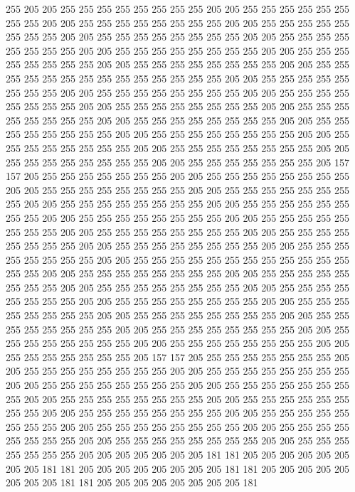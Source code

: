 255 205 205 255 255 255 255 255 255 255 255 205 205 255 255 255 255 255 255 255
255 205 205 255 255 255 255 255 255 255 255 205 205 255 255 255 255 255 255 255
255 205 205 255 255 255 255 255 255 255 255 205 205 255 255 255 255 255 255 255
255 205 205 255 255 255 255 255 255 255 255 205 205 255 255 255 255 255 255 255
255 205 205 255 255 255 255 255 255 255 255 205 205 255 255 255 255 255 255 255
255 255 255 255 255 255 255 205 205 255 255 255 255 255 255 255 255 205 205 255
255 255 255 255 255 255 255 205 205 255 255 255 255 255 255 255 255 205 205 255
255 255 255 255 255 255 255 205 205 255 255 255 255 255 255 255 255 205 205 255
255 255 255 255 255 255 255 205 205 255 255 255 255 255 255 255 255 205 205 255
255 255 255 255 255 255 255 205 205 255 255 255 255 255 255 255 255 205 205 255
255 255 255 255 255 255 255 205 205 255 255 255 255 255 255 255 255 205 205 255
255 255 255 255 255 255 205 157 157 205 255 255 255 255 255 255 255 205 205 255
255 255 255 255 255 255 255 205 205 255 255 255 255 255 255 255 255 205 205 255
255 255 255 255 255 255 255 205 205 255 255 255 255 255 255 255 255 205 205 255
255 255 255 255 255 255 255 205 205 255 255 255 255 255 255 255 255 205 205 255
255 255 255 255 255 255 255 205 205 255 255 255 255 255 255 255 255 205 205 255
255 255 255 255 255 255 255 205 205 255 255 255 255 255 255 255 255 205 205 255
255 255 255 255 255 255 255 205 205 255 255 255 255 255 255 255 255 255 255 255
255 255 255 205 205 255 255 255 255 255 255 255 255 205 205 255 255 255 255 255
255 255 255 205 205 255 255 255 255 255 255 255 255 205 205 255 255 255 255 255
255 255 255 205 205 255 255 255 255 255 255 255 255 205 205 255 255 255 255 255
255 255 255 205 205 255 255 255 255 255 255 255 255 205 205 255 255 255 255 255
255 255 255 205 205 255 255 255 255 255 255 255 255 205 205 255 255 255 255 255
255 255 255 205 205 255 255 255 255 255 255 255 255 205 205 255 255 255 255 255
255 255 205 157 157 205 255 255 255 255 255 255 255 205 205 255 255 255 255 255
255 255 255 205 205 255 255 255 255 255 255 255 255 205 205 255 255 255 255 255
255 255 255 205 205 255 255 255 255 255 255 255 255 205 205 255 255 255 255 255
255 255 255 205 205 255 255 255 255 255 255 255 255 205 205 255 255 255 255 255
255 255 255 205 205 255 255 255 255 255 255 255 255 205 205 255 255 255 255 255
255 255 255 205 205 255 255 255 255 255 255 255 255 205 205 255 255 255 255 255
255 255 255 205 205 255 255 255 255 255 255 255 205 205 205 205 205 205 205 181
181 205 205 205 205 205 205 205 205 181 181 205 205 205 205 205 205 205 205 181
181 205 205 205 205 205 205 205 205 181 181 205 205 205 205 205 205 205 205 181
